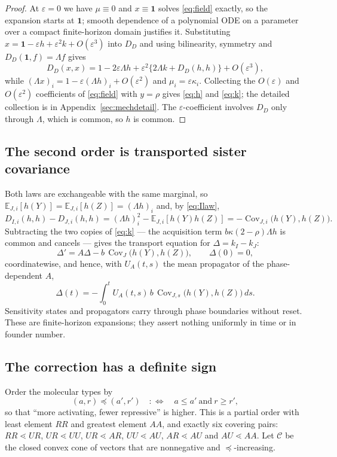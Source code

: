 \documentclass[11pt]{article}
\theoremstyle{remark}
\newcommand{\E}{\mathbb E}
\newcommand{\one}{\mathbf 1}
\newcommand{\eps}{\varepsilon}
\newcommand{\Cov}{\operatorname{Cov}}
\begin{document}
\begin{proof}
At $\eps=0$ we have $\mu\equiv0$ and $x\equiv\one$ solves \eqref{eq:field}
exactly, so the expansion starts at $\one$; smooth dependence of a polynomial ODE
on a parameter over a compact finite-horizon domain justifies it. Substituting
$x=\one-\eps h+\eps^2k+O(\eps^3)$ into $D_D$ and using bilinearity, symmetry and
$D_D(\one,f)=\Lambda f$ gives
\[
 D_D(x,x)=1-2\eps\Lambda h+\eps^2\{2\Lambda k+D_D(h,h)\}+O(\eps^3),
\]
while $(\Lambda x)_i=1-\eps(\Lambda h)_i+O(\eps^2)$ and $\mu_i=\eps\kappa_i$.
Collecting the $O(\eps)$ and $O(\eps^2)$ coefficients of \eqref{eq:field} with
$y=\rho$ gives \eqref{eq:h} and \eqref{eq:k}; the detailed collection is in
Appendix~\ref{sec:mechdetail}. The $\eps$-coefficient involves $D_D$ only through
$\Lambda$, which is common, so $h$ is common.
\end{proof}

\subsection{The second order is transported sister covariance}
Both laws are exchangeable with the same marginal, so
$\E_{J,i}[h(Y)]=\E_{J,i}[h(Z)]=(\Lambda h)_i$ and, by \eqref{eq:Ilaw},
\[
 D_{I,i}(h,h)-D_{J,i}(h,h)=(\Lambda h)_i^2-\E_{J,i}[h(Y)h(Z)]
 =-\Cov_{J,i}\bigl(h(Y),h(Z)\bigr).
\]
Subtracting the two copies of \eqref{eq:k} --- the acquisition term
$b\kappa(2-\rho)\Lambda h$ is common and cancels --- gives the transport equation
for $\Delta=k_I-k_J$:
\begin{equation}
 \boxed{\ \Delta'=A\Delta-b\,\Cov_{J}\bigl(h(Y),h(Z)\bigr),\qquad\Delta(0)=0,\ }
 \label{eq:covtransport}
\end{equation}
coordinatewise, and hence, with $U_A(t,s)$ the mean propagator of the
phase-dependent $A$,
\begin{equation}
 \Delta(t)=-\int_0^tU_A(t,s)\,b\,\Cov_{J,s}\bigl(h(Y),h(Z)\bigr)\,ds.
 \label{eq:duhamel}
\end{equation}
Sensitivity states and propagators carry through phase boundaries without reset.
These are finite-horizon expansions; they assert nothing uniformly in time or in
founder number.

\subsection{The correction has a definite sign}
Order the molecular types by
\begin{equation}
 (a,r)\preceq(a',r')\quad:\Longleftrightarrow\quad a\le a'\ \text{and}\ r\ge r',
 \label{eq:order}
\end{equation}
so that ``more activating, fewer repressive'' is higher. This is a partial order
with least element $RR$ and greatest element $AA$, and exactly six covering
pairs: $RR\lessdot UR$, $UR\lessdot UU$, $UR\lessdot AR$, $UU\lessdot AU$,
$AR\lessdot AU$ and $AU\lessdot AA$. Let $\mathcal C$ be the closed convex cone of
vectors that are nonnegative and $\preceq$-increasing.
\end{document}
